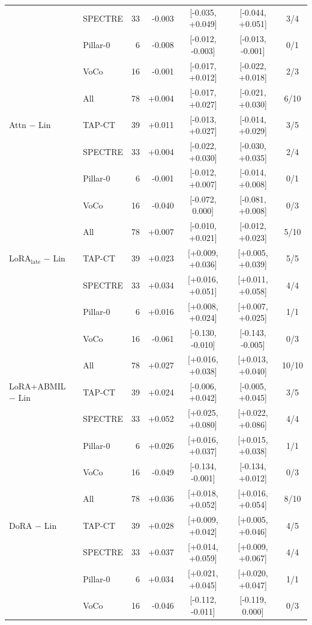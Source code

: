 \begin{tabular}{@{}llrrccc@{}}
 & SPECTRE & 33 & -0.003 & [-0.035, +0.049] & [-0.044, +0.051] & 3/4 \\
 & Pillar-0 & 6 & -0.008 & [-0.012, -0.003] & [-0.013, -0.001] & 0/1 \\
 & VoCo & 16 & -0.001 & [-0.017, +0.012] & [-0.022, +0.018] & 2/3 \\
 & All & 78 & +0.004 & [-0.017, +0.027] & [-0.021, +0.030] & 6/10 \\
\addlinespace[2pt]
Attn $-$ Lin & TAP-CT & 39 & +0.011 & [-0.013, +0.027] & [-0.014, +0.029] & 3/5 \\
 & SPECTRE & 33 & +0.004 & [-0.022, +0.030] & [-0.030, +0.035] & 2/4 \\
 & Pillar-0 & 6 & -0.001 & [-0.012, +0.007] & [-0.014, +0.008] & 0/1 \\
 & VoCo & 16 & -0.040 & [-0.072, 0.000] & [-0.081, +0.008] & 0/3 \\
 & All & 78 & +0.007 & [-0.010, +0.021] & [-0.012, +0.023] & 5/10 \\
\addlinespace[2pt]
LoRA$_{\text{late}}$ $-$ Lin & TAP-CT & 39 & +0.023 & [+0.009, +0.036] & [+0.005, +0.039] & 5/5 \\
 & SPECTRE & 33 & +0.034 & [+0.016, +0.051] & [+0.011, +0.058] & 4/4 \\
 & Pillar-0 & 6 & +0.016 & [+0.008, +0.024] & [+0.007, +0.025] & 1/1 \\
 & VoCo & 16 & -0.061 & [-0.130, -0.010] & [-0.143, -0.005] & 0/3 \\
 & All & 78 & +0.027 & [+0.016, +0.038] & [+0.013, +0.040] & 10/10 \\
\addlinespace[2pt]
LoRA+ABMIL $-$ Lin & TAP-CT & 39 & +0.024 & [-0.006, +0.042] & [-0.005, +0.045] & 3/5 \\
 & SPECTRE & 33 & +0.052 & [+0.025, +0.080] & [+0.022, +0.086] & 4/4 \\
 & Pillar-0 & 6 & +0.026 & [+0.016, +0.037] & [+0.015, +0.038] & 1/1 \\
 & VoCo & 16 & -0.049 & [-0.134, -0.001] & [-0.134, +0.012] & 0/3 \\
 & All & 78 & +0.036 & [+0.018, +0.052] & [+0.016, +0.054] & 8/10 \\
\addlinespace[2pt]
DoRA $-$ Lin & TAP-CT & 39 & +0.028 & [+0.009, +0.042] & [+0.005, +0.046] & 4/5 \\
 & SPECTRE & 33 & +0.037 & [+0.014, +0.059] & [+0.009, +0.067] & 4/4 \\
 & Pillar-0 & 6 & +0.034 & [+0.021, +0.045] & [+0.020, +0.047] & 1/1 \\
 & VoCo & 16 & -0.046 & [-0.112, -0.011] & [-0.119, 0.000] & 0/3 \\

\end{tabular}
